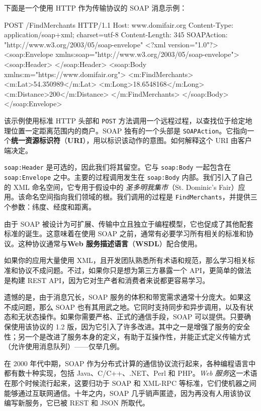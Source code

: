 下面是一个使用 HTTP 作为传输协议的 SOAP 消息示例：

\begin{codebox}[text]
POST /FindMerchants HTTP/1.1
Host: www.domifair.org
Content-Type: application/soap+xml; charset=utf-8
Content-Length: 345
SOAPAction: "http://www.w3.org/2003/05/soap-envelope"
<?xml version="1.0"?>
<soap:Envelope xmlns:soap="http://www.w3.org/2003/05/soap-envelope">
 <soap:Header>
 </soap:Header>
 <soap:Body xmlns:m="https://www.domifair.org">
    <m:FindMerchants>
      <m:Lat>54.350989</m:Lat>
      <m:Long>18.6548168</m:Long>
      <m:Distance>200</m:Distance>
    </m:FindMerchants>
  </soap:Body>
</soap:Envelope>
\end{codebox}

\label{idx:1599}
该示例使用标准 HTTP 头部和 \texttt{POST} 方法调用一个远程过程，以查找位于给定地理位置一定距离范围内的商户。SOAP 独有的一个头部是 \texttt{SOAPAction}。它指向一个\textbf{统一资源标识符}（\textbf{URI}），用以标识该动作的意图。如何解释这个 URI 由客户端决定。

\texttt{soap:Header} 是可选的，因此我们将其留空。它与 \texttt{soap:Body} 一起包含在 \texttt{soap:Envelope} 之中。主要的过程调用发生在 \texttt{soap:Body} 内部。我们引入了自己的 XML 命名空间，它专用于假设中的 \emph{圣多明我集市}（St. Dominic's Fair）应用。该命名空间指向我们领域的根。我们调用的过程是 \texttt{Find\allowbreak{}Merchants}，并提供三个参数：纬度、经度和距离。

\label{idx:1600}
\label{idx:1601}
由于 SOAP 被设计为可扩展、传输中立且独立于编程模型，它也促成了其他配套标准的诞生。这意味着在使用 SOAP 之前，通常有必要学习所有相关的标准和协议。这种协议通常与\textbf{Web 服务描述语言}（\textbf{WSDL}）配合使用。

如果你的应用大量使用 XML，且开发团队熟悉所有术语和规范，那么学习相关标准和协议不成问题。不过，如果你只是想为第三方暴露一个 API，更简单的做法是构建 REST API，因为它对生产者和消费者来说都更容易学习。

遗憾的是，由于消息冗长，SOAP 服务的体积和带宽需求通常十分庞大。如果这不成问题，那么 SOAP 也有其用武之地。它同时支持同步和异步调用，以及有状态和无状态操作。如果你需要严格、正式的通信手段，SOAP 可以提供。只要确保使用该协议的 1.2 版，因为它引入了许多改进。其中之一是增强了服务的安全性；另一个是改进了服务本身的定义，有助于互操作性，并能正式定义传输方式（允许使用消息队列）——仅举几例。

在 2000 年代中期，SOAP 作为分布式计算的通信协议流行起来，各种编程语言中都有数十种实现，包括 Java、C/C++、.NET、Perl 和 PHP。\emph{Web 服务}这一术语在那个时候流行起来，这要归功于 SOAP 和 XML-RPC 等标准，它们使机器之间能够通过互联网通信。十年之内，SOAP 几乎销声匿迹，因为再没有人用该协议编写新服务，它已被 REST 和 JSON 所取代。

